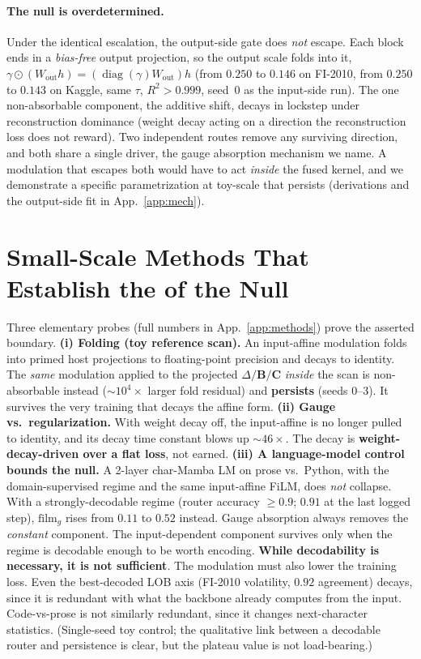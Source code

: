 \documentclass{article}
\DeclareMathOperator{\diagop}{diag}
\newcommand{\diag}{\diagop}
\begin{document}
\paragraph{The null is overdetermined.}
Under
the identical escalation, the output-side gate does \emph{not} escape. Each block
ends in a \emph{bias-free} output projection, so the output scale folds into it,
$\gamma\odot(W_{\text{out}}h)=(\diag(\gamma)W_{\text{out}})h$ (from $0.250$ to
$0.146$ on FI-2010, from $0.250$ to $0.143$ on Kaggle, same $\tau$, $R^2>0.999$,
seed~0 as the input-side run). The one non-absorbable component, the additive shift, decays in
lockstep under reconstruction dominance (weight decay acting on a direction the
reconstruction loss does not reward). Two independent routes remove any surviving direction, and both share a single
driver, the gauge absorption mechanism we name. A modulation that escapes
both would have to act \emph{inside} the fused kernel, and we demonstrate a specific parametrization at toy-scale that persists (derivations and the output-side fit in App.~\ref{app:mech}).

\section{Small-Scale Methods That Establish the  of the Null}\label{sec:methods}

Three elementary probes (full numbers in App.~\ref{app:methods})
prove the asserted boundary. \textbf{(i) Folding (toy
reference scan).} An input-affine modulation folds into primed host projections to
floating-point precision and decays to identity. The \emph{same} modulation
applied to the projected $\Delta/\mathbf{B}/\mathbf{C}$ \emph{inside} the scan is
non-absorbable instead ($\sim10^4\times$ larger fold residual) and
\textbf{persists} (seeds 0--3). It survives the very training that decays the
affine form. \textbf{(ii) Gauge vs.\ regularization.} With weight decay off, the
input-affine is no longer pulled to identity, and its decay time constant blows up
${\sim}46\times$. The decay is \textbf{weight-decay-driven over a flat
loss}, not earned. \textbf{(iii) A language-model control bounds the null.} A
2-layer char-Mamba LM on prose vs.\ Python, with the domain-supervised regime and
the same input-affine FiLM, does \emph{not} collapse. With a strongly-decodable
regime (router accuracy $\ge0.9$; $0.91$ at the last logged step), $\mathrm{film}_g$
rises from $0.11$ to $0.52$ instead. Gauge absorption always removes the \emph{constant} component. The input-dependent component survives only when the regime is decodable enough to be
worth encoding. \textbf{While decodability is necessary, it is not sufficient}. The
modulation must also lower the training loss. Even the best-decoded LOB axis
(FI-2010 volatility, $0.92$ agreement) decays, since it is redundant with what the
backbone already computes from the input. Code-vs-prose is not similarly redundant,
since it changes next-character statistics. (Single-seed toy control; the qualitative link
between a decodable router and persistence is clear, but the plateau value is not
load-bearing.)
\end{document}
